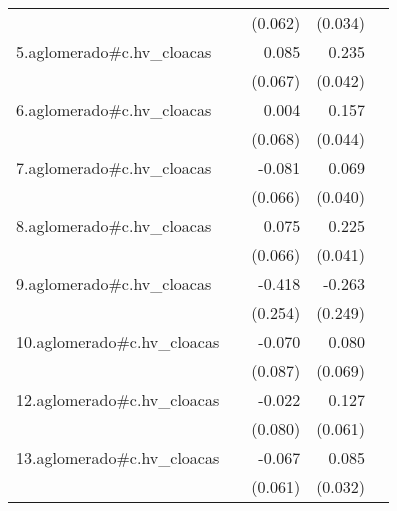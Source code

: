 {\begin{longtable}{l*{4}{D{.}{.}{-1}}}
            &                     &     (0.062)         &     (0.034)         &                     \\
\addlinespace
5.aglomerado#c.hv\_cloacas&                     &       0.085         &       0.235\sym{***}&                     \\
            &                     &     (0.067)         &     (0.042)         &                     \\
\addlinespace
6.aglomerado#c.hv\_cloacas&                     &       0.004         &       0.157\sym{***}&                     \\
            &                     &     (0.068)         &     (0.044)         &                     \\
\addlinespace
7.aglomerado#c.hv\_cloacas&                     &      -0.081         &       0.069         &                     \\
            &                     &     (0.066)         &     (0.040)         &                     \\
\addlinespace
8.aglomerado#c.hv\_cloacas&                     &       0.075         &       0.225\sym{***}&                     \\
            &                     &     (0.066)         &     (0.041)         &                     \\
\addlinespace
9.aglomerado#c.hv\_cloacas&                     &      -0.418         &      -0.263         &                     \\
            &                     &     (0.254)         &     (0.249)         &                     \\
\addlinespace
10.aglomerado#c.hv\_cloacas&                     &      -0.070         &       0.080         &                     \\
            &                     &     (0.087)         &     (0.069)         &                     \\
\addlinespace
12.aglomerado#c.hv\_cloacas&                     &      -0.022         &       0.127\sym{*}  &                     \\
            &                     &     (0.080)         &     (0.061)         &                     \\
\addlinespace
13.aglomerado#c.hv\_cloacas&                     &      -0.067         &       0.085\sym{**} &                     \\
            &                     &     (0.061)         &     (0.032)         &                     \\

\end{longtable}}
